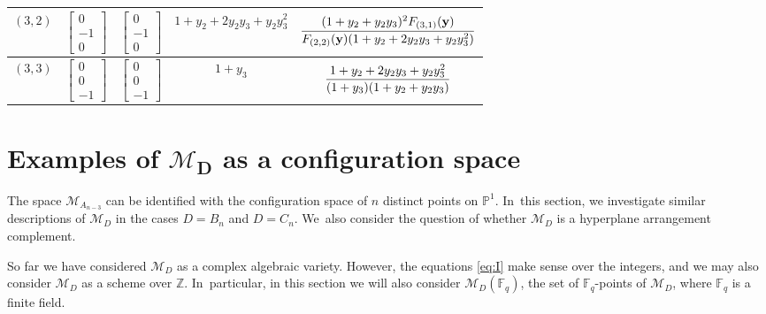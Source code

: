 \documentclass[10pt,a4paper]{amsart}
\def\Z{{\mathbb Z}}
\def\F{{\mathbb F}}
\def\M{{\mathcal{M}}}
\def\y{{\mathbf y}}
\renewcommand{\P}{{\mathbb P}}
\numberwithin{equation}{section}
\begin{document}
\begin{Example}
\begin{table}[t!]
\begin{tabular}{c|c|c|c|c}
\hline
$(3,2)$ & $\begin{bmatrix}0\\[-1ex]-1\\[-1ex]0 \end{bmatrix}$ & $\begin{bmatrix}0\\[-1ex]-1\\[-1ex]0 \end{bmatrix}$ & $1 + y_2 + 2y_2y_3 + y_2y_3^2$ & $\dfrac{(1+y_2+y_2y_3)^2 F_{(3,1)}(\y)}{F_{(2,2)}(\y)(1 + y_2 + 2y_2y_3 + y_2y_3^2)}\vphantom{\begin{bmatrix}1\\[-.5ex]0\\[-.5ex]0 \end{bmatrix}}$\\
\hline
$(3,3)$ & $\begin{bmatrix}0\\[-1ex]0\\[-1ex]-1 \end{bmatrix}$ & $\begin{bmatrix}0\\[-1ex]0\\[-1ex]-1 \end{bmatrix}$ & $1+y_3$ & $\dfrac{1 + y_2 + 2y_2y_3 + y_2y_3^2}{(1+y_3)(1+y_2+y_2y_3)}\vphantom{\begin{bmatrix}1\\[-.5ex]0\\[-.5ex]0 \end{bmatrix}}$
\\
\hline
\end{tabular}
\end{table}
\end{Example}

\section[Examples of MD as a configuration space]
{Examples of $\boldsymbol{\M_D}$ as a configuration space}

The space $\M_{A_{n-3}}$ can be identified with the configuration space of $n$ distinct points on $\P^1$. In~this section, we investigate similar descriptions of $\M_D$ in the cases $D=B_n$ and $D=C_n$. We~also consider the question of whether $\M_D$ is a hyperplane arrangement complement.

So far we have considered $\M_D$ as a complex algebraic variety. However, the equations \eqref{eq:I} make sense over the integers, and we may also consider $\M_D$ as a scheme over $\Z$. In~particular, in this section we will also consider $\M_D(\F_q)$, the set of $\F_q$-points of $\M_D$, where $\F_q$ is a finite field.
\end{document}
